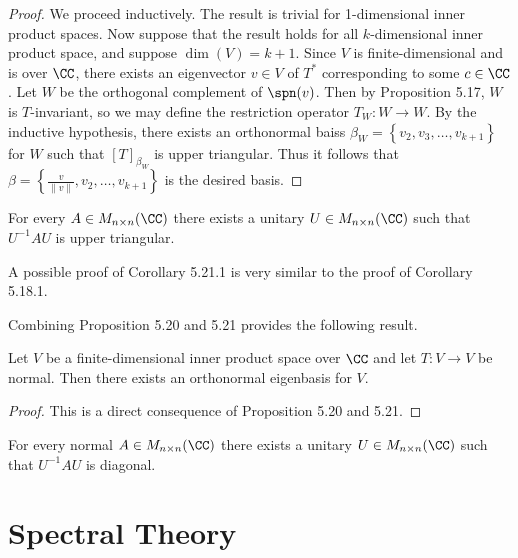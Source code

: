 \documentclass[linearalgebraII]{subfiles}
\begin{document}
    \begin{proof}
        We proceed inductively. The result is trivial for 1-dimensional inner product spaces. Now suppose that the result holds for all $k$-dimensional inner product space, and suppose $\dim\left( V \right) = k+1$. Since $V$ is finite-dimensional and is over $\CC$, there exists an eigenvector $v\in V$ of $T^*$ corresponding to some $c\in\CC$. Let $W$ be the orthogonal complement of $\spn(v)$. Then by Proposition 5.17, $W$ is $T$-invariant, so we may define the restriction operator $T_W:W\to W$. By the inductive hypothesis, there exists an orthonormal baiss $\beta_W = \left\lbrace v_2,v_3,\ldots,v_{k+1} \right\rbrace$ for $W$ such that $\left[ T \right] _{\beta_W}$ is upper triangular. Thus it follows that $\beta = \left\lbrace \frac{v}{\left\lVert v\right\rVert }, v_2, \ldots, v_{k+1} \right\rbrace$ is the desired basis.
    \end{proof}

    \begin{cor}{}
        For every $A\in M_{n\times n}(\CC)$ there exists a unitary $U\in M_{n\times n}(\CC)$ such that $U^{-1}AU$ is upper triangular.
    \end{cor}	

    \begin{remark}
        A possible proof of Corollary 5.21.1 is very similar to the proof of Corollary 5.18.1.
    \end{remark}

    \begin{remark}
        Combining Proposition 5.20 and 5.21 provides the following result.
    \end{remark}

    \begin{theorem}{}
        Let $V$ be a finite-dimensional inner product space over $\CC$ and let $T:V\to V$ be normal. Then there exists an orthonormal eigenbasis for $V$.
    \end{theorem}

    \begin{proof}
        This is a direct consequence of Proposition 5.20 and 5.21.
    \end{proof}

    \begin{cor}{}
        For every normal $A\in M_{n\times n}(\CC)$ there exists a unitary $U\in M_{n\times n}(\CC)$ such that $U^{-1}AU$ is diagonal.
    \end{cor}	

    \section{Spectral Theory}
    
\end{document}
